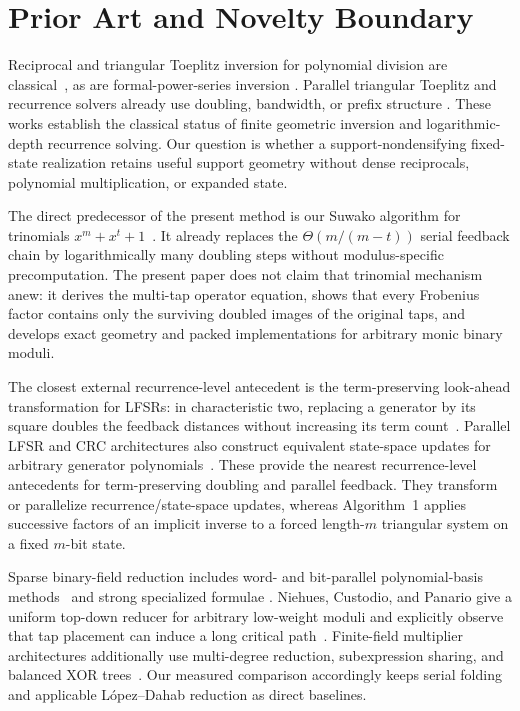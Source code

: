 \documentclass{mcom-l}
\numberwithin{equation}{section}
\theoremstyle{definition}
\theoremstyle{remark}
\begin{document}
\section{Prior Art and Novelty Boundary}
\label{sec:related}

Reciprocal and triangular Toeplitz inversion for polynomial division are
classical~\cite{BiniPan1985}, as are formal-power-series inversion
\cite{Kalorkoti1993}.  Parallel triangular Toeplitz and recurrence solvers
already use doubling, bandwidth, or prefix structure
\cite{Bini1984,Morf1980,KoggeStone1973,HoLee1990}. These works establish the
classical status of finite geometric inversion and logarithmic-depth
recurrence solving. Our question is whether a support-nondensifying fixed-state
realization retains useful support geometry without dense reciprocals,
polynomial multiplication, or expanded state.

The direct predecessor of the present method is our Suwako algorithm for
trinomials $x^m+x^t+1$~\cite[Lemma~2, Eq.~(5)]{ZhouEtAl2025Suwako}.  It already replaces the
$\Theta(m/(m-t))$ serial feedback chain by logarithmically many doubling steps
without modulus-specific precomputation.  The present paper does not claim
that trinomial mechanism anew: it derives the multi-tap operator equation,
shows that every Frobenius factor contains only the surviving doubled images
of the original taps, and develops exact geometry and packed implementations
for arbitrary monic binary moduli.

The closest external recurrence-level antecedent is the term-preserving look-ahead transformation
for LFSRs: in characteristic two, replacing a generator by its square doubles
the feedback distances without increasing its term count~\cite{LinEtAl2013}.
Parallel LFSR and CRC architectures also construct equivalent state-space
updates for arbitrary generator polynomials~\cite{AyinalaParhi2011}. These
provide the nearest recurrence-level antecedents for term-preserving doubling
and parallel feedback. They transform or parallelize recurrence/state-space
updates, whereas Algorithm~1 applies successive factors of an implicit inverse
to a forced length-$m$ triangular system on a fixed $m$-bit state.

Sparse binary-field reduction includes word- and bit-parallel polynomial-basis
methods~\cite{Wu1999} and strong specialized formulae
\cite{LopezDahab2000}.  Niehues, Custodio, and Panario give a uniform
top-down reducer for arbitrary low-weight moduli and explicitly observe that
tap placement can induce a long critical path~\cite{NiehuesEtAl2018}.
Finite-field multiplier architectures additionally use multi-degree
reduction, subexpression sharing, and balanced XOR trees~\cite{Meher2009}.
Our measured comparison accordingly keeps serial folding and applicable
L\'opez--Dahab reduction as direct baselines.
\end{document}
